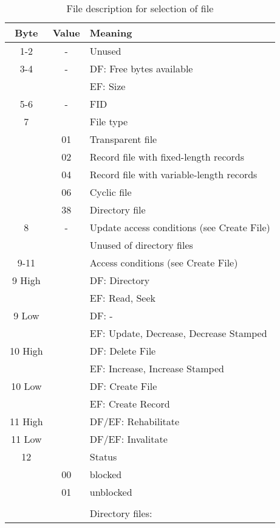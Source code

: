 \documentclass[a4paper,oneside]{article}
\begin{document}
\begin{table}[h!]
\caption{File description for selection of file}
\begin{center}
\begin{tabular}{|c|c|l|} \hline
Byte & Value & Meaning  \\ \hline \hline
1-2  &  -  &  Unused  \\ \hline
3-4  &  -  &  DF: Free bytes available  \\
     &     &  EF: Size \\ \hline
5-6  &  -  &  FID  \\ \hline
7    &     &  File type  \\ \cline{2-3}
     &  01 &  Transparent file \\ \cline{2-3}
     &  02 &  Record file with fixed-length records \\ \cline{2-3}
     &  04 &  Record file with variable-length records \\ \cline{2-3}
     &  06 &  Cyclic file \\ \cline{2-3}
     &  38 &  Directory file  \\ \hline
8    &  -  &  Update access conditions (see Create File) \\
     &     &  Unused of directory files \\ \hline
9-11 &     &  Access conditions (see Create File) \\ \hline
9 High &   &  DF: Directory \\
     &     &  EF: Read, Seek \\ \hline
9 Low &    &  DF: - \\
     &     &  EF: Update, Decrease, Decrease Stamped \\ \hline
10 High &  &  DF: Delete File \\
     &     &  EF: Increase, Increase Stamped \\\hline
10 Low &   &  DF: Create File \\
     &     &  EF: Create Record \\ \hline
11 High &  &  DF/EF: Rehabilitate \\ \hline
11 Low &   &  DF/EF: Invalitate \\ \hline
12   &     &  Status \\ \cline{2-3}
     &  00 &  blocked \\ \cline{2-3}
     &  01 &  unblocked \\ \hline
     &     &  \\ \hline
     &     &  Directory files: \\ \hline

\end{tabular}
\end{center}
\end{table}
\end{document}
